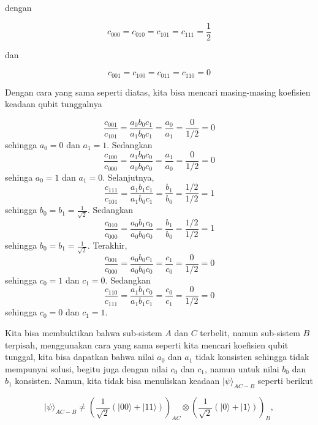 dengan

\begin{equation}
	c_{000}=c_{010}=c_{101}=c_{111}=\frac{1}{2}
\end{equation}

dan

\begin{equation}
	c_{001}=c_{100}=c_{011}=c_{110}=0
\end{equation}

Dengan cara yang sama seperti diatas, kita bisa mencari masing-masing koefisien keadaan qubit tunggalnya

\begin{equation}
	\frac{c_{001}}{c_{101}}=\frac{a_0 b_0 c_1}{a_1 b_0 c_1}=\frac{a_0}{a_1}=\frac{0}{1/2}=0
\end{equation}
sehingga $a_0=0$ dan $a_1=1$.
Sedangkan
\begin{equation}
	\frac{c_{100}}{c_{000}}=\frac{a_1 b_0 c_0}{a_0 b_0 c_0}=\frac{a_1}{a_0}=\frac{0}{1/2}=0
\end{equation}
sehinga $a_0=1$ dan $a_1=0$. Selanjutnya,
\begin{equation}
	\frac{c_{111}}{c_{101}}=\frac{a_1 b_1 c_1}{a_1 b_0 c_1}=\frac{b_1}{b_0}=\frac{1/2}{1/2}=1
\end{equation}
sehingga $b_0=b_1=\frac{1}{\sqrt{2}}$.
Sedangkan
\begin{equation}
	\frac{c_{010}}{c_{000}}=\frac{a_0 b_1 c_0}{a_0 b_0 c_0}=\frac{b_1}{b_0}=\frac{1/2}{1/2}=1
\end{equation}
sehingga $b_0=b_1=\frac{1}{\sqrt{2}}$. Terakhir,
\begin{equation}
	\frac{c_{001}}{c_{000}}=\frac{a_0 b_0 c_1}{a_0 b_0 c_0}=\frac{c_1}{c_0}=\frac{0}{1/2}=0
\end{equation}
sehingga $c_0=1$ dan $c_1=0$.
Sedangkan
\begin{equation}
	\frac{c_{110}}{c_{111}}=\frac{a_1 b_1 c_0}{a_1 b_1 c_1}=\frac{c_0}{c_1}=\frac{0}{1/2}=0
\end{equation}
sehingga $c_0=0$ dan $c_1=1$.

Kita bisa membuktikan bahwa sub-sistem $A$ dan $C$ terbelit, namun sub-sistem $B$ terpisah, menggunakan cara yang sama seperti kita mencari koefisien qubit tunggal, kita bisa dapatkan bahwa nilai $a_0$ dan $a_1$ tidak konsisten sehingga tidak mempunyai solusi, begitu juga dengan nilai $c_0$ dan $c_1$, namun untuk nilai $b_0$ dan $b_1$ konsisten. Namun, kita tidak bisa menuliskan keadaan $|\psi\rangle_{AC-B}$ seperti berikut

\begin{equation}
|\psi\rangle_{AC-B}
\neq
\left(
\frac{1}{\sqrt{2}}
(|00\rangle + |11\rangle)
\right)_{AC}
\otimes
\left(
\frac{1}{\sqrt{2}}
(|0\rangle + |1\rangle)
\right)_B ,
\end{equation}

